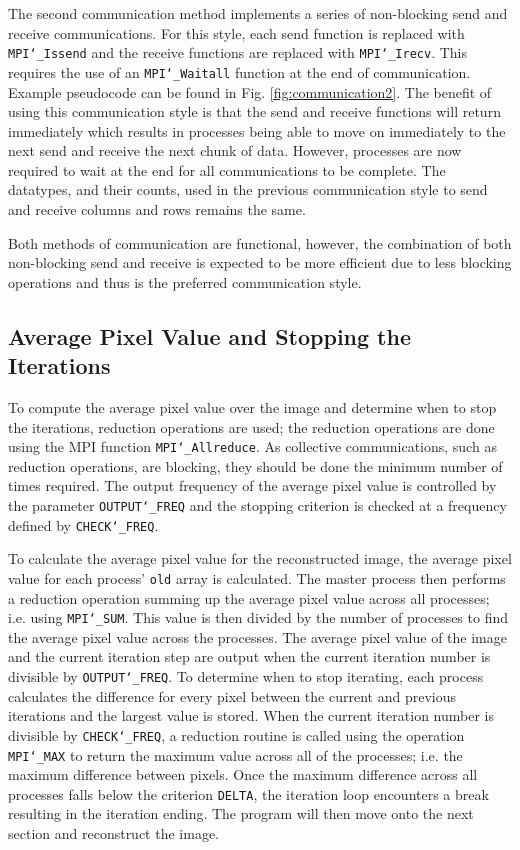 \documentclass[11pt, a4paper]{article}
\begin{document}
			The second communication method implements a series of non-blocking send and receive communications. For this style, each send function is replaced with \texttt{MPI\char`_Issend} and the receive functions are replaced with \texttt{MPI\char`_Irecv}. This requires the use of an \texttt{MPI\char`_Waitall} function at the end of communication. Example pseudocode can be found in Fig. \ref{fig:communication2}. The benefit of using this communication style is that the send and receive functions will return immediately which results in processes being able to move on immediately to the next send and receive the next chunk of data. However, processes are now required to wait at the end for all communications to be complete. The datatypes, and their counts, used in the previous communication style to send and receive columns and rows remains the same.
			
			Both methods of communication are functional, however, the combination of both non-blocking send and receive is expected to be more efficient due to less blocking operations and thus is the preferred communication style.
			
		\subsection{Average Pixel Value and Stopping the Iterations}
			To compute the average pixel value over the image and determine when to stop the iterations, reduction operations are used; the reduction operations are done using the MPI function \texttt{MPI\char`_Allreduce}. As collective communications, such as reduction operations, are blocking, they should be done the minimum number of times required. The output frequency of the average pixel value is controlled by the parameter \texttt{OUTPUT\char`_FREQ} and the stopping criterion is checked at a frequency defined by \texttt{CHECK\char`_FREQ}.
			
			To calculate the average pixel value for the reconstructed image, the average pixel value for each process' \texttt{old} array is calculated. The master process then performs a reduction operation summing up the average pixel value across all processes; i.e. using \texttt{MPI\char`_SUM}. This value is then divided by the number of processes to find the average pixel value across the processes. The average pixel value of the image and the current iteration step are output when the current iteration number is divisible by \texttt{OUTPUT\char`_FREQ}. To determine when to stop iterating, each process calculates the difference for every pixel between the current and previous iterations and the largest value is stored. When the current iteration number is divisible by \texttt{CHECK\char`_FREQ}, a reduction routine is called using the operation \texttt{MPI\char`_MAX} to return the maximum value across all of the processes; i.e. the maximum difference between pixels. Once the maximum difference across all processes falls below the criterion \texttt{DELTA}, the iteration loop encounters a break resulting in the iteration ending. The program will then move onto the next section and reconstruct the image.
			
\end{document}
